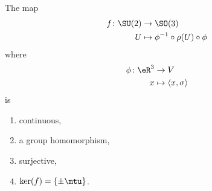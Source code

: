 \begin{proposition}     \label{PROPooGEHAooPCReoU}
	The map
	\begin{equation}        \label{EQooSOZTooTIkONx}
		\begin{aligned}
			f\colon \SU(2) & \to \SO(3)                              \\
			U              & \mapsto \phi^{-1}\circ \rho(U)\circ\phi
		\end{aligned}
	\end{equation}
	where
	\begin{equation}
		\begin{aligned}
			\phi\colon \eR^3 & \to V                            \\
			x                & \mapsto \langle x, \sigma\rangle
		\end{aligned}
	\end{equation}
	is
	\begin{enumerate}
		\item
		      continuous,
		\item
		      a group homomorphism,
		\item       \label{ITEMooZSSHooDUCqSQ}
		      surjective,
		\item
		      \( \ker(f)=\{ \pm \mtu \}\).
	\end{enumerate}
\end{proposition}

